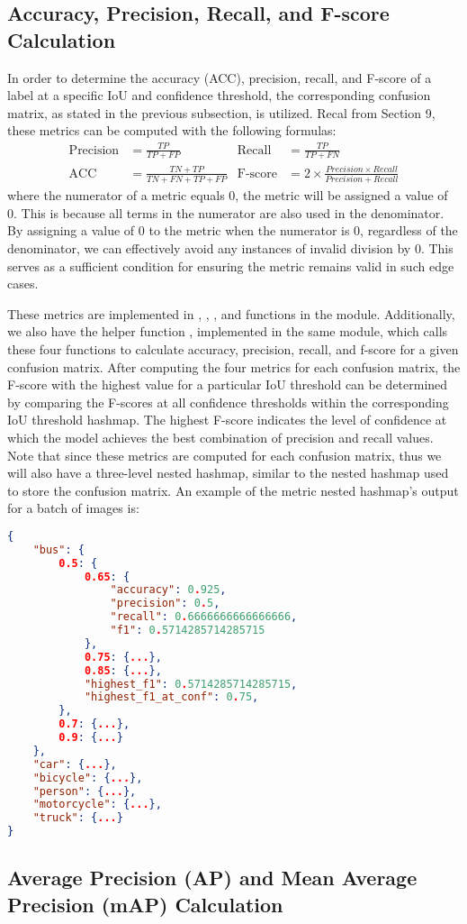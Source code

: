 \subsection{Accuracy, Precision, Recall, and F-score Calculation}
In order to determine the accuracy (ACC), precision, recall, and F-score of a label at a specific IoU and confidence threshold, the corresponding confusion matrix, as stated in the previous subsection, is utilized.
Recal from Section 9, these metrics can be computed with the following formulas: 
\begin{align*}
    \text{Precision} &= \frac{TP}{TP+FP}     &  \text{Recall} &= \frac{TP}{TP+FN} \\
    \text{ACC} &= \frac{TN+TP}{TN+FN+TP+FP}  &  \text{F-score} &= 2 \times \frac{Precision \times Recall}{Precision + Recall}
\end{align*}
where the numerator of a metric equals 0, the metric will be assigned a value of 0. This is because all terms in the numerator are also used in the denominator. By assigning a value of 0 to the metric when the numerator is 0, regardless of the denominator, we can effectively avoid any instances of invalid division by 0. This serves as a sufficient condition for ensuring the metric remains valid in such edge cases.

These metrics are implemented in , , , and  functions in the  module. Additionally, we also have the helper function , implemented in the same module, which calls these four functions to calculate accuracy, precision, recall, and f-score for a given confusion matrix. After computing the four metrics for each confusion matrix, the F-score with the highest value for a particular IoU threshold can be determined by comparing the F-scores at all confidence thresholds within the corresponding IoU threshold hashmap. The highest F-score indicates the level of confidence at which the model achieves the best combination of precision and recall values. Note that since these metrics are computed for each confusion matrix, thus we will also have a three-level nested hashmap, similar to the nested hashmap used to store the confusion matrix. An example of the metric nested hashmap's output for a batch of images is:
\begin{lstlisting}[language=json,firstnumber=1]
{
    "bus": {
        0.5: {
            0.65: {
                "accuracy": 0.925,
                "precision": 0.5,
                "recall": 0.6666666666666666,
                "f1": 0.5714285714285715
            },
            0.75: {...},
            0.85: {...},
            "highest_f1": 0.5714285714285715,
            "highest_f1_at_conf": 0.75,
        },
        0.7: {...},
        0.9: {...}
    },
    "car": {...},
    "bicycle": {...},
    "person": {...},
    "motorcycle": {...},
    "truck": {...}
}
\end{lstlisting}

\subsection{Average Precision (AP) and Mean Average Precision (mAP) Calculation}